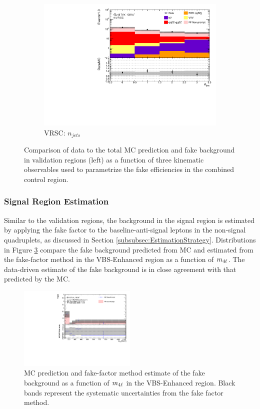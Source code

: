 \begin{figure}[!htb]
\begin{subfigure}{.48\textwidth}
        \includegraphics[width = 0.85\linewidth]{figures/Analysis/Background/Overlay_VRSC_FFApplied_n_jets.pdf}
        \caption{VRSC: $n_{jets}$ \label{fig:AllDataMCYield_VRSC_njet}}
    \end{subfigure}
        \caption{ Comparison of data to the total MC prediction and fake background in validation regions (left) as a function of three kinematic observables used to parametrize the fake efficiencies in the combined control region.\label{fig:AllDataMCYield}}
\end{figure}

\subsubsection{Signal Region Estimation}
\label{subsubsec:SREstimation}
Similar to the validation regions, the background in the signal region is estimated by applying the fake factor to the baseline-anti-signal leptons in the non-signal quadruplets, as discussed in Section \ref{subsubsec:EstimationStrategy}. Distributions in Figure \ref{fig:MCFFRedComparison} compare the fake background predicted from MC and estimated from the fake-factor method in the VBS-Enhanced region as a function of $m_{4\ell}$. The data-driven estimate of the fake background is in close agreement with that predicted by the MC.

\begin{figure}[!htb]
    \centering
    \includegraphics[width=0.5\textwidth]{figures/Analysis/Background/MCRedCompare_VBS_Enhanced_M4l.pdf}
    \caption{ MC prediction and fake-factor method estimate of the fake background as a function of $m_{4\ell}$ in the VBS-Enhanced region. Black bands represent the systematic uncertainties from the fake factor method. \label{fig:MCFFRedComparison}}
\end{figure}

